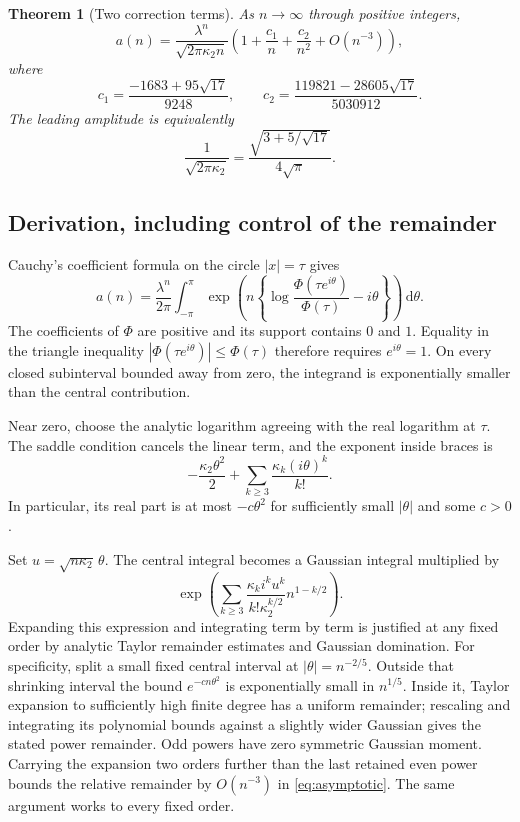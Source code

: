 \documentclass[11pt,a4paper]{article}
\numberwithin{equation}{section}
\newtheorem{theorem}{Theorem}[section]
\theoremstyle{definition}
\theoremstyle{remark}
\newcommand{\dd}{\,\mathrm d}
\begin{document}
\begin{theorem}[Two correction terms]\label{thm:asymptotic}
As $n\to\infty$ through positive integers,
\begin{equation}\label{eq:asymptotic}
 a(n)=\frac{\lambda^n}{\sqrt{2\pi\kappa_2n}}
 \left(1+\frac{c_1}{n}+\frac{c_2}{n^2}+O(n^{-3})\right),
\end{equation}
where
\begin{equation}\label{eq:c1c2}
 c_1=\frac{-1683+95\sqrt{17}}{9248},\qquad
 c_2=\frac{119821-28605\sqrt{17}}{5030912}.
\end{equation}
The leading amplitude is equivalently
\begin{equation}\label{eq:amplitude}
 \frac1{\sqrt{2\pi\kappa_2}}=
 \frac{\sqrt{3+5/\sqrt{17}}}{4\sqrt\pi}.
\end{equation}
\end{theorem}

\subsection{Derivation, including control of the remainder}
Cauchy's coefficient formula on the circle $|x|=\tau$ gives
\begin{equation}\label{eq:cauchy}
 a(n)=\frac{\lambda^n}{2\pi}
 \int_{-\pi}^{\pi}
 \exp\left(n\left\{
 \log\frac{\Phi(\tau e^{i\theta})}{\Phi(\tau)}-i\theta
 \right\}\right)\dd\theta.
\end{equation}
The coefficients of $\Phi$ are positive and its support contains $0$ and
$1$. Equality in the triangle inequality
$|\Phi(\tau e^{i\theta})|\le\Phi(\tau)$ therefore requires
$e^{i\theta}=1$. On every closed subinterval bounded away from zero, the
integrand is exponentially smaller than the central contribution.

Near zero, choose the analytic logarithm agreeing with the real logarithm
at $\tau$. The saddle condition cancels the linear term, and the exponent
inside braces is
\begin{equation}\label{eq:local-exponent}
 -\frac{\kappa_2\theta^2}{2}
 +\sum_{k\ge3}\frac{\kappa_k(i\theta)^k}{k!}.
\end{equation}
In particular, its real part is at most $-c\theta^2$ for sufficiently small
$|\theta|$ and some $c>0$.

Set $u=\sqrt{n\kappa_2}\,\theta$. The central integral becomes a Gaussian
integral multiplied by
\[
 \exp\left(\sum_{k\ge3}
 \frac{\kappa_k i^k u^k}
 {k!\kappa_2^{k/2}}n^{1-k/2}\right).
\]
Expanding this expression and integrating term by term is justified at any
fixed order by analytic Taylor remainder estimates and Gaussian domination.
For specificity, split a small fixed central interval at
$|\theta|=n^{-2/5}$. Outside that shrinking interval the bound
$e^{-cn\theta^2}$ is exponentially small in $n^{1/5}$. Inside it, Taylor
expansion to sufficiently high finite degree has a uniform remainder;
rescaling and integrating its polynomial bounds against a slightly wider
Gaussian gives the stated power remainder. Odd powers have zero symmetric
Gaussian moment. Carrying the expansion two orders further than the last
retained even power bounds the relative remainder by $O(n^{-3})$ in
\eqref{eq:asymptotic}. The same argument works to every fixed order.
\end{document}

